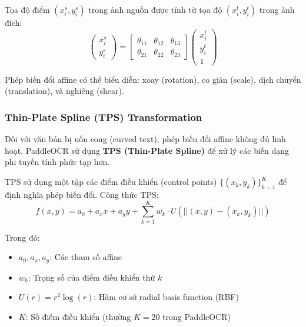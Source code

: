 Tọa độ điểm $(x_i^s, y_i^s)$ trong ảnh nguồn được tính từ tọa độ $(x_i^t, y_i^t)$ trong ảnh đích:
\begin{equation}
    \begin{pmatrix} x_i^s \\ y_i^s \end{pmatrix} = \begin{bmatrix}
        \theta_{11} & \theta_{12} & \theta_{13} \\
        \theta_{21} & \theta_{22} & \theta_{23}
    \end{bmatrix} \begin{pmatrix} x_i^t \\ y_i^t \\ 1 \end{pmatrix}
\end{equation}

Phép biến đổi affine có thể biểu diễn: xoay (rotation), co giãn (scale), dịch chuyển (translation), và nghiêng (shear).

\subsubsection{Thin-Plate Spline (TPS) Transformation}
Đối với văn bản bị uốn cong (curved text), phép biến đổi affine không đủ linh hoạt. PaddleOCR sử dụng \textbf{TPS (Thin-Plate Spline)} \cite{shi2016robust} để xử lý các biến dạng phi tuyến tính phức tạp hơn.

TPS sử dụng một tập các điểm điều khiển (control points) $\{(x_k, y_k)\}_{k=1}^{K}$ để định nghĩa phép biến đổi. Công thức TPS:
\begin{equation}
    f(x, y) = a_0 + a_x x + a_y y + \sum_{k=1}^{K} w_k \cdot U(||(x, y) - (x_k, y_k)||)
\end{equation}

Trong đó:
\begin{itemize}
    \item $a_0, a_x, a_y$: Các tham số affine
    \item $w_k$: Trọng số của điểm điều khiển thứ $k$
    \item $U(r) = r^2 \log(r)$: Hàm cơ sở radial basis function (RBF)
    \item $K$: Số điểm điều khiển (thường $K = 20$ trong PaddleOCR)
\end{itemize}

